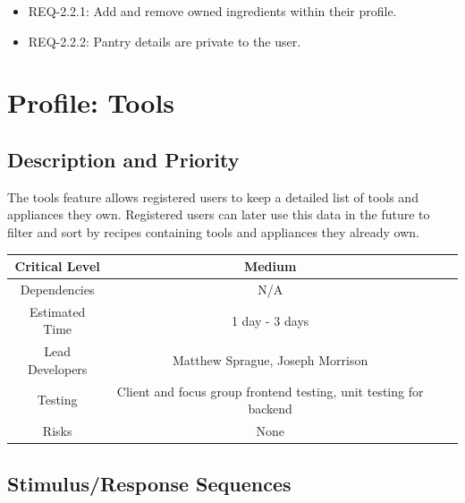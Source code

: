 \documentclass{scrreprt}
\begin{document}
\begin{itemize}
    \item REQ-2.2.1: Add and remove owned ingredients within their profile.
    \item REQ-2.2.2: Pantry details are private to the user.
\end{itemize}

\section{Profile: Tools}

\subsection{Description and Priority}

The tools feature allows registered users to keep a detailed list of tools and appliances they own. Registered users can later use this data in the future to filter and sort by recipes containing tools and appliances they already own.

\begin{center}
    \begin{tabular}{| c | c | c | c |}
        \hline
        Critical Level  & Medium                                                            \\
        \hline
        Dependencies    & N/A                                                               \\
        \hline
        Estimated Time  & 1 day - 3 days                                                    \\
        \hline
        Lead Developers & Matthew Sprague, Joseph Morrison                                  \\
        \hline
        Testing         & Client and focus group \gls{frontend} testing,
                          \gls{unit testing} for \gls{backend}                              \\
        \hline
        Risks           & None                                                              \\
        \hline
    \end{tabular}
\end{center}

\subsection{Stimulus/Response Sequences}
\end{document}

